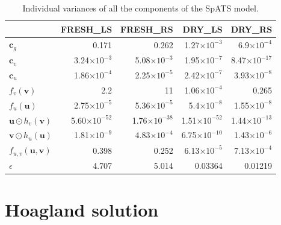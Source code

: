 \begin{table}[ht]
\centering
{}
\caption{Individual variances of all the components of the SpATS model.} 
\begin{tabular}{lrrrr}
  \toprule
 & FRESH\_LS & FRESH\_RS & DRY\_LS & DRY\_RS \\ 
  \midrule
$\mathbf{c}_{g}$ & 0.171 & 0.262 & 1.27$\times 10^{-3}$ & 6.9$\times 10^{-4}$ \\ 
  $\mathbf{c}_{v}$ & 3.24$\times 10^{-3}$ & 5.08$\times 10^{-3}$ & 1.95$\times 10^{-7}$ & 8.47$\times 10^{-17}$ \\ 
  $\mathbf{c}_{u}$ & 1.86$\times 10^{-4}$ & 2.25$\times 10^{-5}$ & 2.42$\times 10^{-7}$ & 3.93$\times 10^{-8}$ \\ 
  $f_{v}(\mathbf{v})$ & 2.2 & 11 & 1.06$\times 10^{-4}$ & 0.265 \\ 
  $f_{u}(\mathbf{u})$ & 2.75$\times 10^{-5}$ & 5.36$\times 10^{-5}$ & 5.4$\times 10^{-8}$ & 1.55$\times 10^{-8}$ \\ 
  $\boldsymbol{u} \odot h_{v}(\boldsymbol{v})$ & 5.60$\times 10^{-52}$ & 1.76$\times 10^{-38}$ & 1.51$\times 10^{-52}$ & 1.44$\times 10^{-13}$ \\ 
  $\boldsymbol{v} \odot h_{u}(\boldsymbol{u})$ & 1.81$\times 10^{-9}$ & 4.83$\times 10^{-4}$ & 6.75$\times 10^{-10}$ & 1.43$\times 10^{-6}$ \\ 
  $f_{u, v}(\boldsymbol{u}, \boldsymbol{v})$ & 0.398 & 0.252 & 6.13$\times 10^{-5}$ & 7.13$\times 10^{-4}$ \\ 
  $\epsilon$ & 4.707 & 5.014 & 0.03364 & 0.01219\\
   \bottomrule
\end{tabular}
\label{tab:spats_variances}
\end{table}

\chapter{Hoagland solution}
\label{appendix:hoagland}


